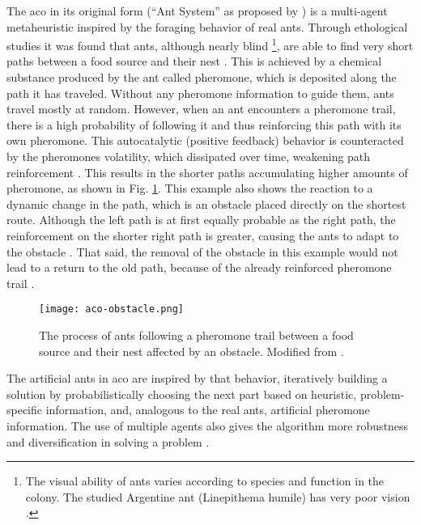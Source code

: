 The \gls{aco} in its original form (\enquote{Ant System} as proposed by \citet{dorigo1996ant}) is a multi-agent metaheuristic inspired by the foraging behavior of real ants.
 Through ethological studies it was found that ants, although nearly blind \footnote{The visual ability of ants varies according to species and function in the colony. The studied Argentine ant (Linepithema humile) has very poor vision \cite{talbi2009metaheuristics}.}, are able to find very short paths between a food source and their nest \cite{goss1989self}. This is achieved by a chemical substance produced by the ant called pheromone, which is deposited along the path it has traveled. Without any pheromone information to guide them, ants travel mostly at random. However, when an ant encounters a pheromone trail, there is a high probability of following it and thus reinforcing this path with its own pheromone. This autocatalytic (positive feedback) behavior is counteracted by the pheromones volatility, which dissipated over time, weakening path reinforcement \cite{dorigo1996ant}. This results in the shorter paths accumulating higher amounts of pheromone, as shown in Fig. \ref{fig:aco-obstacle}. This example also shows the reaction to a dynamic change in the path, which is an obstacle placed directly on the shortest route. Although the left path is at first equally probable as the right path, the reinforcement on the shorter right path is greater, causing the ants to adapt to the obstacle \cite{talbi2009metaheuristics}. That said, the removal of the obstacle in this example would not lead to a return to the old path, because of the already reinforced pheromone trail \cite{dorigo2004ant}.

\begin{figure}[h]
	\centering
	\texttt{[image: aco-obstacle.png]}
	\caption[The process of ants following a pheromone trail]{The process of ants following a pheromone trail between a food source and their nest affected by an obstacle. Modified from \citet{talbi2009metaheuristics}.}
	\label{fig:aco-obstacle}
\end{figure}

The artificial ants in \gls{aco} are inspired by that behavior, iteratively building a solution by probabilistically choosing the next part based on heuristic, problem-specific information, and, analogous to the real ants, artificial pheromone information. The use of multiple agents also gives the algorithm more robustness and diversification in solving a problem \cite{dorigo2019ant}.

